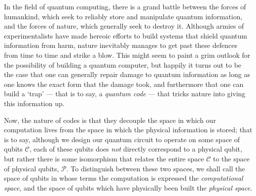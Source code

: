 \documentclass[twocolumn,showpacs,preprintnumbers,amsmath,amssymb,nofootinbib,pra,floatfix]{revtex4}
\begin{document}
In the field of quantum computing, there is a grand battle between the forces of humankind, which seek to reliably store and manipulate quantum information, and the forces of nature, which generally seek to destroy it.  Although armies of experimentalists have made hereoic efforts to build systems that shield quantum information from harm, nature inevitably manages to get past these defences from time to time and strike a blow.  This might seem to paint a grim outlook for the possibility of building a quantum computer, but happily it turns out to be the case that one can generally repair damage to quantum information as long as one knows the exact form that the damage took, and furthermore that one can build a `trap' --- that is to say, a \emph{quantum code} --- that tricks nature into giving this information up.

Now, the nature of codes is that they decouple the space in which our computation lives from the space in which the physical information is stored;  that is to say, although we design our quantum circuit to operate on some space of qubits $\mathscr{C}$, each of these qubits does \emph{not} directly correspond to a physical qubit, but rather there is some isomorphism that relates the entire space $\mathscr{C}$ to the space of physical qubits, $\mathscr{P}$.  To distinguish between these two spaces, we shall call the space of qubits in whose terms the computation is expressed the \emph{computational space}, and the space of qubits which have physically been built the \emph{physical space}.
\end{document}
